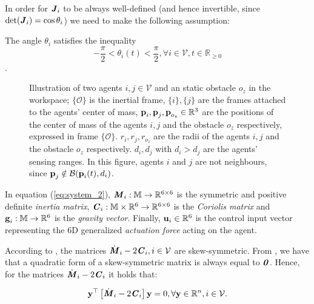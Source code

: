 In order for $\bm{\mathit{J}}_i$ to be always well-defined (and hence invertible, since
$\det(\bm{\mathit{J}}_i) = \cos\theta_i$) we need to make the following assumption:

\begin{assumption} \label{as:J}
	The angle $\theta_i$ satisfies the inequality
  $$-\frac{\pi}{2} < \theta_i(t) < \frac{\pi}{2} ,\forall i\in\mathcal{V},t\in\mathbb{R}_{\geq 0}$$.
\end{assumption}

\begin{figure}[ht!]
	\centering
    
    \caption{Illustration of two agents $i, j \in \mathcal{V}$ and an static
      obstacle $o_z$ in the workspace; $\{\mathcal{O}\}$ is the inertial frame,
      $\{i\}, \{j\}$ are the frames attached to the agents' center of mass,
      $\bm{\mathbf{p}}_i, \bm{\mathbf{p}}_j, \bm{\mathbf{p}}_{o_z} \in \mathbb{R}^3$ are the
      positions of the center of mass of the agents $i,j$ and the
      obstacle $o_z$ respectively, expressed in frame
      $\{\mathcal{O}\}$. $r_i, r_j, r_{o_z}$ are the radii of the agents $i,j$
      and the obstacle $o_z$ respectively. $d_i, d_j$ with
      $d_i > d_j$ are the agents' sensing ranges.
      In this figure, agents $i$ and $j$ are not neighbours, since
      $\bm{\mathbf{p}}_j \notin \mathcal{B}(\bm{\mathbf{p}}_i(t), d_i)$.}
	\label{fig:two_agents_one_obstacle}
\end{figure}

In equation (\ref{eq:system_2}), $\bm{\mathit{M}}_i:\mathbb{M} \to \mathbb{R}^{6\times6}$ is
the symmetric and positive definite \textit{inertia matrix},
$\bm{\mathit{C}}_i:\mathbb{M}\times\mathbb{R}^6 \to \mathbb{R}^{6\times6}$ is the
\textit{Coriolis matrix} and $\bm{\mathbf{g}}_i:\mathbb{M} \to \mathbb{R}^6$ is the
\textit{gravity vector}.
Finally, $\bm{\mathbf{u}}_i\in\mathbb{R}^6$ is the control input vector representing
the $6$D generalized \textit{actuation force} acting on the agent.



\begin{graybox}
  \begin{remark}
    According to \cite{Siciliano2009}, the matrices
    $\dot{\bm{\mathit{M}}}_i - 2\bm{\mathit{C}}_i, i \in \mathcal{V}$ are skew-symmetric.
    From \cite{horn_jonshon}, we have that a quadratic form of a skew-symmetric
    matrix is always equal to $\bm{\mathit{0}}$. Hence, for the matrices
    $\dot{\bm{\mathit{M}}}_i - 2 \bm{\mathit{C}}_i$ it holds that:

    \begin{equation} \label{eq:skew_symm}
      \bm{\mathbf{y}}^\top \left[\dot{\bm{\mathit{M}}}_i - 2 \bm{\mathit{C}}_i\right]\bm{\mathbf{y}} = 0,
        \forall \bm{\mathbf{y}} \in \mathbb{R}^n, i \in \mathcal{V}.
    \end{equation}
  \end{remark}
\end{graybox}

